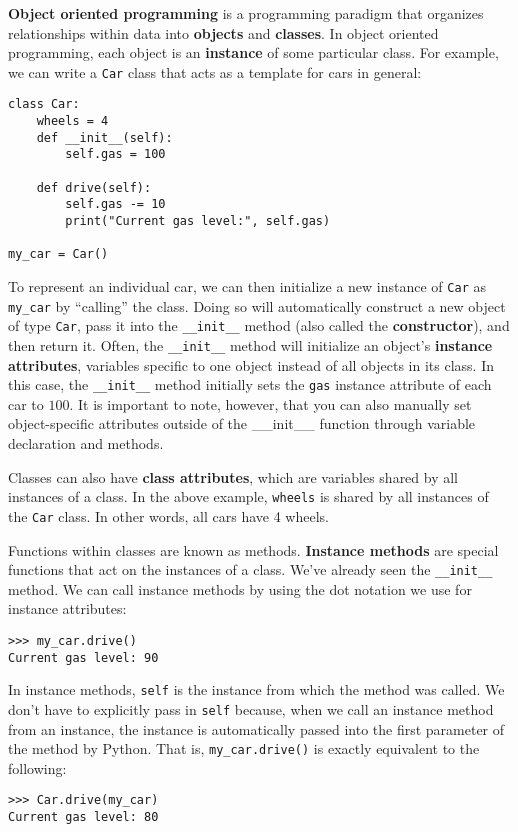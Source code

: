 \textbf{Object oriented programming} is a programming paradigm that organizes relationships within data into \textbf{objects} and \textbf{classes}. In object oriented programming, each object is an \textbf{instance} of some particular class. For example, we can write a \lstinline{Car} class that acts as a template for cars in general: 

\begin{lstlisting}
class Car:
    wheels = 4
    def __init__(self):
        self.gas = 100

    def drive(self):
        self.gas -= 10
        print("Current gas level:", self.gas)

my_car = Car()
\end{lstlisting}

To represent an individual car, we can then initialize a new instance of \lstinline{Car} as \lstinline{my_car} by ``calling'' the class. Doing so will automatically construct a new object of type \lstinline{Car}, pass it into the \lstinline{__init__} method (also called the \textbf{constructor}), and then return it. Often, the \lstinline{__init__} method will initialize an object's \textbf{instance attributes}, variables specific to one object instead of all objects in its class. In this case, the \lstinline{__init__} method initially sets the \lstinline{gas} instance attribute of each car to $100$. It is important to note, however, that you can also manually set object-specific attributes outside of the __init__ function through variable declaration and methods.

Classes can also have \textbf{class attributes}, which are variables shared by all instances of a class. In the above example, \lstinline{wheels} is shared by all instances of the \lstinline{Car} class. In other words, all cars have 4 wheels. 

Functions within classes are known as methods. \textbf{Instance methods} are special functions that act on the instances of a class. We've already seen the \lstinline{__init__} method. We can call instance methods by using the dot notation we use for instance attributes: 
\begin{lstlisting}
>>> my_car.drive()
Current gas level: 90
\end{lstlisting}
In instance methods, \lstinline{self} is the instance from which the method was called.  We don’t have to explicitly pass in \lstinline{self} because, when we call an instance method from an instance, the instance is automatically passed into the first parameter of the method by Python. That is, \lstinline{my_car.drive()} is exactly equivalent to the following: 
\begin{lstlisting}
>>> Car.drive(my_car)
Current gas level: 80
\end{lstlisting}

